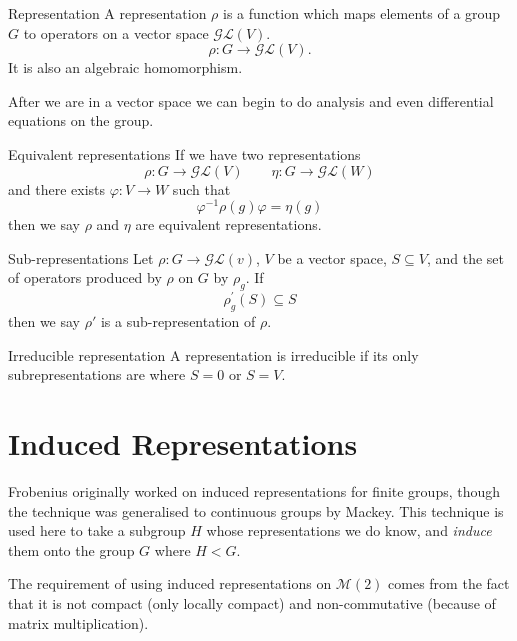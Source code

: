 \documentclass{article}
\begin{document}
\begin{Define}{Representation}
    A representation $\rho$ is a function which maps elements of a group $G$ to operators on a vector space $\mathcal{GL}(V)$. \[ \rho : G \rightarrow \mathcal{GL}(V) .\]
    It is also an algebraic homomorphism. 
\end{Define}
After we are in a vector space we can begin to do analysis and even differential equations on the group.\par

\begin{Define}{Equivalent representations}
    If we have two representations
    \[%
        \rho : G \rightarrow \mathcal{GL}(V) 
        \qquad
        \eta : G \rightarrow \mathcal{GL}(W)
    \]%
    and there exists $\varphi : V \rightarrow W$ such that 
    \[%
        \varphi^{-1} \rho(g) \varphi = \eta(g)
    \]%
    then we say $\rho$ and $\eta$ are equivalent representations.
\end{Define}

\begin{Define}{Sub-representations}
    Let $\rho : G \rightarrow \mathcal{GL}(v)$, $V$ be a vector space, $S \subseteq V$, and the set of operators produced by $\rho$ on $G$ by $\rho_{g}$. If 
    \[%
        \rho^{'}_{g}(S) \subseteq S
    \]%
    then we say $\rho'$ is a sub-representation of $\rho$.
\end{Define}

\begin{Define}{Irreducible representation}
    A representation is irreducible if its only subrepresentations are where $S=0$ or $S=V$.
\end{Define}

%    


\section{Induced Representations} 
\label{sec:induced_representations}
Frobenius originally worked on induced representations for finite groups, though the technique was generalised to continuous groups by Mackey. This technique is used here to take a subgroup $H$ whose representations we do know, and \textit{induce} them onto the group $G$ where $H < G$. 

The requirement of using induced representations on $\mathcal{M}(2)$ comes from the fact that it is not compact (only locally compact) and non-commutative (because of matrix multiplication). 
\end{document}
